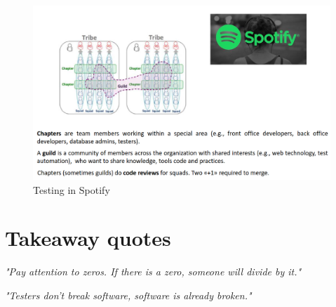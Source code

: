 \begin{figure}[htbp]
   \centering
   \includegraphics{images/testing_spotify.png}
   \caption{Testing in Spotify}
   \label{fig:testing_spotify}
\end{figure}
\section{Takeaway quotes}
\begin{center}
   \textit{"Pay attention to zeros. If there is a zero, someone will divide by it."}

   \textit{"Testers don’t break software, software is already broken."}
\end{center}